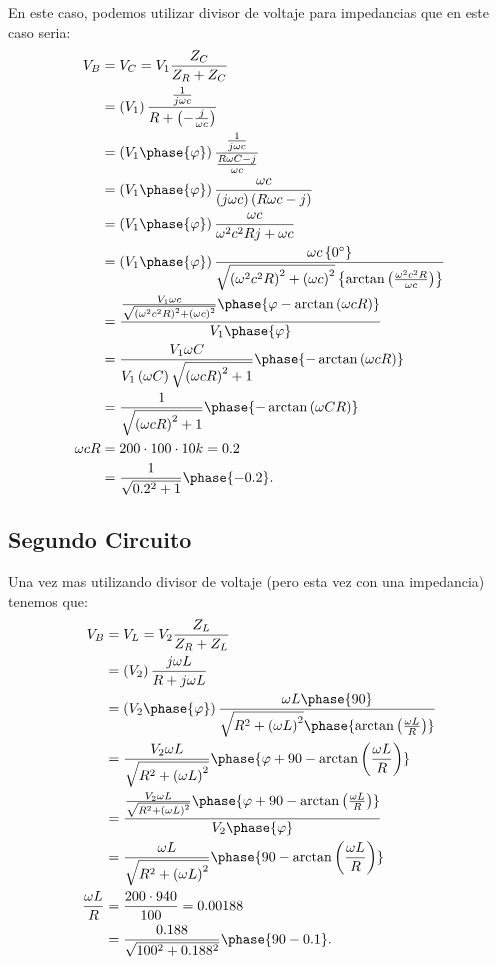 \documentclass[12pt]{article}
\begin{document}
En este caso, podemos utilizar divisor de voltaje para impedancias que en este caso seria:
\begin{align*}
  V_{B} &= V_{C} = V_1 \frac{Z_C}{Z_R + Z_C} \\
  &= \left( V_1 \right) \frac{\frac{1}{j \omega c}}{R + \left( - \frac{j}{\omega c} \right) } \\
  &= \left( V_1 \phase{\varphi} \right) \frac{\frac{1}{j\omega c}}{\frac{R\omega C - j}{\omega c}}  \\
  &= \left( V_1 \phase{\varphi} \right) \frac{\omega c}{\left( j \omega c \right) \left( R\omega c - j \right) }\\
  &= \left( V_1 \phase{\varphi} \right) \frac{\omega c}{\omega^2c^2R j + \omega c} \\
  &= \left( V_1 \phase{\varphi} \right) \frac{\omega c \left\{ 0^{\circ} \right\} }{\sqrt{\left( \omega^2c^2R \right) ^2 + \left( \omega c \right)^2 }\left\{ \arctan\left( \frac{\omega^2 c^2 R}{\omega c} \right)  \right\} } \\
  &= \frac{\frac{V_{1}\omega c}{\sqrt{\left( \omega^2 c^2 R \right)^2 + \left( \omega c \right)^2} }\phase{ \varphi - \arctan\left( \omega c R \right)}}{V_1\phase{\varphi} }  \\
  &= \frac{V_1 \omega C}{V_1 \left( \omega C \right) \sqrt{\left( \omega c R \right)^2 + 1} }\phase{ -\arctan\left( \omega c R \right)  }  \\
  &= \frac{1}{\sqrt{\left( \omega c R \right)^2 + 1} } \phase{ -\arctan\left( \omega C R \right)} \\
  \omega c R &= 200 \cdot 100 \cdot 10k = 0.2\\
	     &= \frac{1}{\sqrt{0.2^2 + 1} }\phase{-0.2}
.\end{align*}

\subsection*{Segundo Circuito}

Una vez mas utilizando divisor de voltaje (pero esta vez con una impedancia) tenemos que:
\begin{align*}
  V_B &= V_L = V_2 \frac{Z_L}{Z_R + Z_L} \\
  &= \left( V_2 \right) \frac{j\omega L}{R + j\omega L} \\
  &= \left( V_2 \phase{\varphi} \right) \frac{\omega L \phase{90}}{\sqrt{R^2 + \left( \omega L \right)^2} \phase{\arctan\left( \frac{\omega L}{R} \right) }} \\
  &= \frac{V_2 \omega L}{\sqrt{R^2 + \left( \omega L \right)^2} }\phase{\varphi + 90 - \arctan\left( \frac{\omega L}{R} \right) } \\
  &=  \frac{\frac{V_2 \omega L}{\sqrt{R^2 + \left( \omega L \right)^2}} \phase{\varphi + 90 - \arctan\left( \frac{\omega L}{R} \right) }}{V_{2}\phase{\varphi}}\\
  &= \frac{\omega L}{\sqrt{R^2 + \left( \omega L \right)^2} }\phase{90 - \arctan\left( \frac{\omega L}{R} \right) } \\
  \frac{\omega L}{R} &= \frac{200\cdot 940}{100} = 0.00188\\
		     &= \frac{0.188}{\sqrt{100^2 + 0.188^2} } \phase{90 - 0.1}
.\end{align*}
\end{document}
